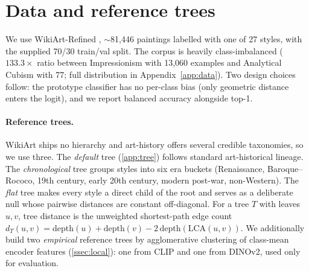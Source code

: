 \section{Data and reference trees}
\label{sec:data}

We use WikiArt-Refined \citep{tan2019wikiart}, $\sim$81{,}446
paintings labelled with one of 27 styles, with the supplied 70/30
train/val split. The corpus is heavily class-imbalanced
($133.3\times$ ratio between Impressionism with 13{,}060 examples and
Analytical Cubism with 77; full distribution in
Appendix~\ref{app:data}). Two design choices follow: the prototype
classifier has no per-class bias (only geometric distance enters the
logit), and we report balanced accuracy alongside top-1.

\paragraph{Reference trees.} WikiArt ships no hierarchy and
art-history offers several credible taxonomies, so we use three. The
\emph{default} tree (\cref{app:tree}) follows standard
art-historical lineage. The \emph{chronological} tree groups styles
into six era buckets (Renaissance, Baroque--Rococo, 19th century,
early 20th century, modern post-war, non-Western). The \emph{flat}
tree makes every style a direct child of the root and serves as a
deliberate null whose pairwise distances are constant off-diagonal.
For a tree $T$ with leaves $u, v$, tree distance is the unweighted
shortest-path edge count
$d_T(u, v) = \mathrm{depth}(u) + \mathrm{depth}(v) - 2\,\mathrm{depth}(\mathrm{LCA}(u, v))$.
We additionally build two \emph{empirical} reference trees by
agglomerative clustering of class-mean encoder features
(\cref{ssec:local}): one from CLIP and one from DINOv2, used only
for evaluation.
